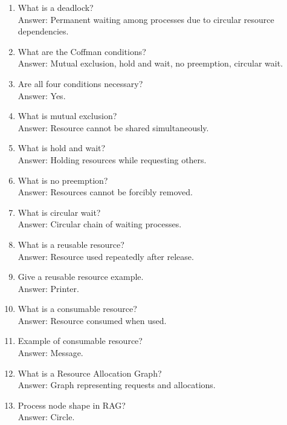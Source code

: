 \begin{enumerate}
\item What is a deadlock?\\
Answer: Permanent waiting among processes due to circular resource dependencies.

\item What are the Coffman conditions?\\
Answer: Mutual exclusion, hold and wait, no preemption, circular wait.

\item Are all four conditions necessary?\\
Answer: Yes.

\item What is mutual exclusion?\\
Answer: Resource cannot be shared simultaneously.

\item What is hold and wait?\\
Answer: Holding resources while requesting others.

\item What is no preemption?\\
Answer: Resources cannot be forcibly removed.

\item What is circular wait?\\
Answer: Circular chain of waiting processes.

\item What is a reusable resource?\\
Answer: Resource used repeatedly after release.

\item Give a reusable resource example.\\
Answer: Printer.

\item What is a consumable resource?\\
Answer: Resource consumed when used.

\item Example of consumable resource?\\
Answer: Message.

\item What is a Resource Allocation Graph?\\
Answer: Graph representing requests and allocations.

\item Process node shape in RAG?\\
Answer: Circle.


\end{enumerate}
